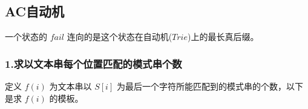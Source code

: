 \documentclass[
]{article}
\begin{document}
\hypertarget{acux81eaux52a8ux673a}{%
\subsection{AC自动机}\label{acux81eaux52a8ux673a}}

一个状态的 \(fail\) 连向的是这个状态在自动机(\(Trie\))上的最长真后缀。

\hypertarget{ux6c42ux4ee5ux6587ux672cux4e32ux6bcfux4e2aux4f4dux7f6eux5339ux914dux7684ux6a21ux5f0fux4e32ux4e2aux6570}{%
\subsubsection{1.求以文本串每个位置匹配的模式串个数}\label{ux6c42ux4ee5ux6587ux672cux4e32ux6bcfux4e2aux4f4dux7f6eux5339ux914dux7684ux6a21ux5f0fux4e32ux4e2aux6570}}

定义 \(f(i)\) 为文本串以 \(S[i]\)
为最后一个字符所能匹配到的模式串的个数，以下是求 \(f(i)\) 的模板。
\end{document}
